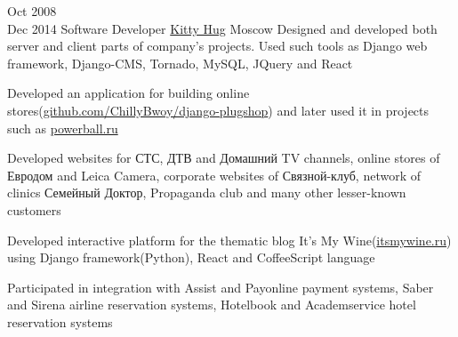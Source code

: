 \documentclass[11pt,a4paper,sans]{moderncv}
\newcommand{\lang}[2]{#2}
\begin{document}
	\cventry
		{\lang{Окт}{Oct} 2008\\\lang{Дек}{Dec} 2014}
		{\lang
			{Программист}
			{Software Developer}}
		{\href{http://kittyhug.ru}{Kitty Hug}}
		{\lang
			{Москва}
			{Moscow}}
		{}
		{\lang
			{Занимался разработкой и проектированием как серверной, так и клиентской части проектов компании. Использовал Django, Django-CMS, Tornado, MySQL, JQuery и React, занимался написанием юнит-тестов.}
			{Designed and developed both server and client parts of company's projects. Used such tools as Django web framework, Django-CMS, Tornado, MySQL, JQuery and React}}

		\cvlistitem
		{\lang
			{Разработал приложение \href{https://github.com/ChillyBwoy/django-plugshop}{django-plugshop}, на основе к��торого в дальнейшем было созд��но не��колько интернет-магазинов, например deathstar.ru и \href{http://powerball.ru}{powerball.ru}}
			{Developed an application for building online stores(\href{https://github.com/ChillyBwoy/django-plugshop}{github.com/ChillyBwoy/django-plugshop})} and later used it in projects such as \href{http://powerball.ru}{powerball.ru}}

		\cvlistitem
		{\lang
			{Делал сайты для телеканалов СТС, ДТВ и Домашний, интернет-магазина «Евродом», фотоаппаратов «Leica Camera», «Связного-клуба», сети поликлиник «Семейный Доктор», клуба «Пропаганда», кафе «Filial»(\href{http://filialmoscow.com/ru/}{filialmoscow.com}), торгово-офисного центра «Гименей»(\href{http://himeney.ru}{himeney.ru}) и многих других менее известных клиентов}
			{Developed websites for {\textquotedbl}СТС{\textquotedbl}, {\textquotedbl}ДТВ{\textquotedbl} and {\textquotedbl}Домашний{\textquotedbl} TV channels, online stores of {\textquotedbl}Евродом{\textquotedbl} and {\textquotedbl}Leica Camera{\textquotedbl}, corporate websites of {\textquotedbl}Связной-клуб{\textquotedbl}, network of clinics {\textquotedbl}Семейный Доктор{\textquotedbl}, {\textquotedbl}Propaganda club{\textquotedbl} and many other lesser-known customers}}

		\cvlistitem
		{\lang
			{Разработал интерактивную издательскую платформу для тематического блога «It's My Wine»(\href{http://itsmywine.ru}{itsmywine.ru})}
			{Developed interactive platform for the thematic blog {\textquotedbl}It's My Wine{\textquotedbl}(\href{http://itsmywine.ru}{itsmywine.ru}) using Django framework(Python), React and CoffeeScript language}}

		\cvlistitem
		{\lang
			{Занимался интеграцией с платёжными системами Assist и Payonline, системами бронирования авиабилетов Sabre и Sirena, системами бронирования отелей Hotelbook и Академсервис}
			{Participated in integration with {\textquotedbl}Assist{\textquotedbl} and {\textquotedbl}Payonline{\textquotedbl} payment systems, {\textquotedbl}Saber{\textquotedbl} and {\textquotedbl}Sirena{\textquotedbl} airline reservation systems, {\textquotedbl}Hotelbook{\textquotedbl} and {\textquotedbl}Academservice{\textquotedbl} hotel reservation systems}\\}
\end{document}
